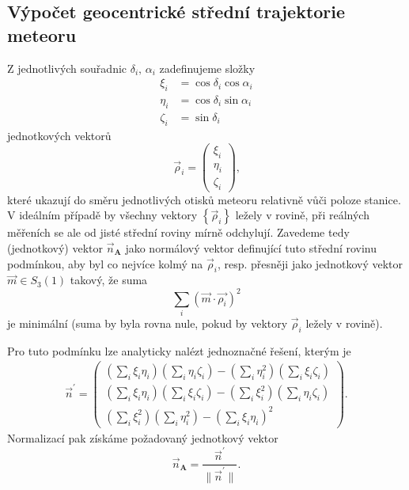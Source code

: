 \subsection{Výpočet geocentrické střední trajektorie meteoru}
Z jednotlivých souřadnic $\delta_i,\,\alpha_i$ zadefinujeme složky
\begin{equation}
    \begin{aligned}
        \xi_i&=\cos{\delta_i}\cos{\alpha_i}\\
        \eta_i&=\cos{\delta_i}\sin{\alpha_i}\\
        \zeta_i&=\sin{\delta_i}
    \end{aligned}
\end{equation}
jednotkových vektorů
$$
\vec{\rho}_i=\begin{pmatrix}
    \xi_i\\\eta_i\\\zeta_i
\end{pmatrix}\text{,}
$$
které ukazují do směru jednotlivých otisků meteoru relativně vůči poloze stanice. V ideálním případě by všechny vektory $\left\{\vec{\rho}_i\right\}$ ležely v rovině, při reálných měřeních se ale od jisté střední roviny mírně odchylují. Zavedeme tedy (jednotkový) vektor $\vec{n}_\mathbf{A}$ jako normálový vektor definující tuto střední rovinu podmínkou, aby byl co nejvíce kolmý na $\vec{\rho}_i$, resp. přesněji jako jednotkový vektor $\vec{m}\in S_3(1)$ takový, že suma
$$
    \sum_{i}{\left( \vec{m}\cdot\vec{\rho_i} \right)^2}
$$
je minimální \cite{ceplecha} (suma by byla rovna nule, pokud by vektory $\vec{\rho}_i$ ležely v rovině).

Pro tuto podmínku lze analyticky nalézt jednoznačné řešení, kterým je \cite{ceplecha}
\begin{equation}
    \begin{aligned}
        \vec{n}^\prime=\begin{pmatrix}
            \left( \sum_{i}{\xi_i\eta_i} \right)\left( \sum_{i}{\eta_i\zeta_i} \right)-\left( \sum_{i}{\eta_i^2} \right)\left( \sum_{i}{\xi_i\zeta_i} \right)\\
            \left( \sum_{i}{\xi_i\eta_i} \right)\left( \sum_{i}{\xi_i\zeta_i} \right)-\left( \sum_{i}{\xi_i^2} \right)\left( \sum_{i}{\eta_i\zeta_i} \right)\\
            \left( \sum_{i}{\xi_i^2} \right)\left( \sum_{i}{\eta_i^2} \right)-\left( \sum_{i}{\xi_i\eta_i} \right)^2
        \end{pmatrix}\text{.}
    \end{aligned}
\end{equation}
Normalizací pak získáme požadovaný jednotkový vektor
\begin{equation}
    \vec{n}_\mathbf{A}=\frac{\vec{n}^\prime}{\lVert \vec{n}^\prime \rVert }\text{.}
\end{equation}

